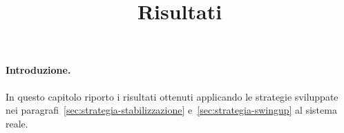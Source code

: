 \title{Risultati}
\maketitle
\label{sec:results}

\paragraph{Introduzione.}

In questo capitolo riporto i risultati ottenuti applicando le strategie
sviluppate nei paragrafi~\ref{sec:strategia-stabilizzazione} 
e~\ref{sec:strategia-swingup} al sistema reale.


\relax

